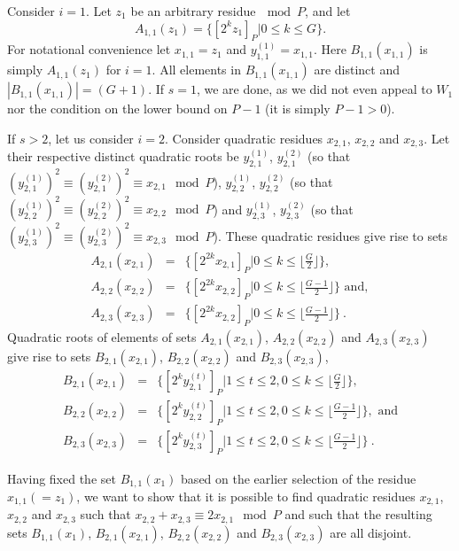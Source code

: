 Consider $i=1$. Let $z_1$ be an arbitrary residue$~\mod P$, and
let \[A_{1,1}(z_1)=\{[2^{k}z_1]_P | 0 \leq k \leq G \}.\] For
notational convenience let $x_{1,1}=z_1$ and
$y_{1,1}^{(1)}=x_{1,1}$. Here $B_{1,1}(x_{1,1})$ is simply
$A_{1,1}(z_1)$ for $i=1$. All elements in $B_{1,1}(x_{1,1})$ are
distinct and $|B_{1,1}(x_{1,1})| =(G+1)$. If $s=1$, we are done,
as we did not even appeal to $W_1$ nor the condition on the lower
bound on $P-1$ (it is simply $P-1>0$).

If $s>2$, let us consider $i=2$. Consider quadratic residues
$x_{2,1}$, $x_{2,2}$ and $x_{2,3}$. Let  their respective distinct
quadratic roots be $y_{2,1}^{(1)}$, $y_{2,1}^{(2)}$ (so that
$(y_{2,1}^{(1)})^2 \equiv (y_{2,1}^{(2)})^2 \equiv x_{2,1} \mod
P$), $y_{2,2}^{(1)}$, $y_{2,2}^{(2)}$ (so that $(y_{2,2}^{(1)})^2
\equiv (y_{2,2}^{(2)})^2 \equiv x_{2,2} \mod P$) and
$y_{2,3}^{(1)}$, $y_{2,3}^{(2)}$ (so that $(y_{2,3}^{(1)})^2
\equiv (y_{2,3}^{(2)})^2 \equiv x_{2,3} \mod P$). These quadratic
residues give rise to sets
\begin{eqnarray}
A_{2,1}(x_{2,1})&=&\{ [2^{2k}x_{2,1}]_P | 0 \leq k \leq \lfloor
\frac{G}{2} \rfloor\},\\ A_{2,2}(x_{2,2})&=& \{ [2^{2k}x_{2,2}]_P
| 0
\leq k \leq \lfloor \frac{G-1}{2} \rfloor\} \text{ and},\\
A_{2,3}(x_{2,3})&=& \{ [2^{2k}x_{2,2}]_P | 0 \leq k \leq \lfloor
\frac{G-1}{2} \rfloor\}~.
\end{eqnarray}
Quadratic roots of elements of sets $A_{2,1}(x_{2,1})$,
$A_{2,2}(x_{2,2})$ and $A_{2,3}(x_{2,3})$ give rise to sets
$B_{2,1}(x_{2,1})$, $B_{2,2}(x_{2,2})$ and $B_{2,3}(x_{2,3})$,
\begin{eqnarray}
B_{2,1}(x_{2,1})&=&\{[2^ky_{2,1}^{(t)}]_P | 1 \leq t \leq 2, 0
\leq k
\leq \lfloor \frac{G}{2}\rfloor\},\\
B_{2,2}(x_{2,2})&=&\{[2^ky_{2,2}^{(t)}]_P | 1 \leq t \leq 2, 0
\leq k
\leq \lfloor \frac{G-1}{2}\rfloor\}, \text{ and}\\
B_{2,3}(x_{2,3})&=&\{[2^ky_{2,3}^{(t)}]_P | 1 \leq t \leq 2, 0
\leq k \leq \lfloor \frac{G-1}{2}\rfloor\}~.
\end{eqnarray}


Having fixed the set $B_{1,1}(x_1)$ based on the earlier selection
of the residue $x_{1,1} (=z_1)$, we want to show that it is
possible to find quadratic residues $x_{2,1}$, $x_{2,2}$ and
$x_{2,3}$ such that $x_{2,2} + x_{2,3} \equiv 2x_{2,1} \mod P$ and
such that the resulting sets $B_{1,1}(x_1)$, $B_{2,1}(x_{2,1})$,
$B_{2,2}(x_{2,2})$ and $B_{2,3}(x_{2,3})$ are all disjoint.

